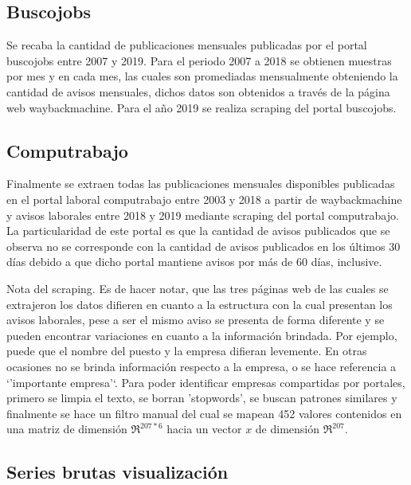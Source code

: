 \documentclass[12pt,twoside]{reedthesis}
\begin{document}
\hypertarget{buscojobs}{%
\subsection*{Buscojobs}\label{buscojobs}}

Se recaba la cantidad de publicaciones mensuales publicadas por el portal buscojobs entre 2007 y 2019. Para el periodo 2007 a 2018 se obtienen muestras por mes y en cada mes, las cuales son promediadas mensualmente obteniendo la cantidad de avisos mensuales, dichos datos son obtenidos a través de la página web waybackmachine.
Para el año 2019 se realiza scraping del portal buscojobs.

\hypertarget{computrabajo}{%
\subsection*{Computrabajo}\label{computrabajo}}

Finalmente se extraen todas las publicaciones mensuales disponibles publicadas en el portal laboral computrabajo entre 2003 y 2018 a partir de waybackmachine y avisos laborales entre 2018 y 2019 mediante scraping del portal computrabajo. La particularidad de este portal es que la cantidad de avisos publicados que se observa no se corresponde con la cantidad de avisos publicados en los últimos 30 días debido a que dicho portal mantiene avisos por más de 60 días, inclusive.

Nota del scraping. Es de hacer notar, que las tres páginas web de las cuales se extrajeron los datos difieren en cuanto a la estructura con la cual presentan los avisos laborales, pese a ser el mismo aviso se presenta de forma diferente y se pueden encontrar variaciones en cuanto a la información brindada. Por ejemplo, puede que el nombre del puesto y la empresa difieran levemente. En otras ocasiones no se brinda información respecto a la empresa, o se hace referencia a `'importante empresa'`. Para poder identificar empresas compartidas por portales, primero se limpia el texto, se borran 'stopwords', se buscan patrones similares y finalmente se hace un filtro manual del cual se mapean 452 valores contenidos en una matriz de dimensión \(\Re^{207*6}\) hacia un vector \(x\) de dimensión \(\Re^{207}\).

\hypertarget{series-brutas-visualizaciuxf3n}{%
\subsection{Series brutas visualización}\label{series-brutas-visualizaciuxf3n}}
\end{document}

